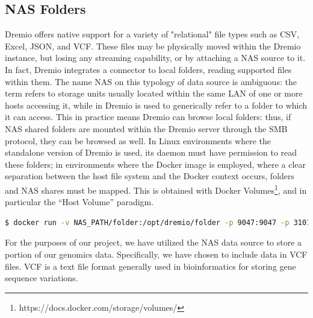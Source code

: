 \subsection{NAS Folders}
Dremio offers native support for a variety of "relational" file types such as \ac{CSV}, Excel, \ac{JSON}, and \ac{VCF}. These files may be physically moved within the Dremio instance, but losing any streaming capability, or by attaching a \ac{NAS} source to it. In fact, Dremio integrates a connector to local folders, reading supported files within them. The name \ac{NAS} on this typology of data source is ambiguous: the term refers to storage units usually located within the same \ac{LAN} of one or more hosts accessing it, while in Dremio is used to generically refer to a folder to which it can access.
This in practice means Dremio can browse local folders: thus, if NAS shared folders are mounted within the Dremio server through the \ac{SMB} protocol, they can be browsed as well.
In Linux environments where the standalone version of Dremio is used, its daemon must have permission to read these folders; in environments where the Docker image is employed, where a clear separation between the host file system and the Docker context occurs, folders and \ac{NAS} shares must be mapped. This is obtained with Docker Volumes\footnote{ https://docs.docker.com/storage/volumes/}, and in particular the “Host Volume” paradigm.
\begin{lstlisting}[language=bash, caption={Docker command to run a Dremio container with a Host Volume}, label={lst:docker-host-volume}]
$ docker run -v NAS_PATH/folder:/opt/dremio/folder -p 9047:9047 -p 31010:31010 -p 45678:45678 -p 32010:32010 --name hereditary_dremio dremio/dremio-oss
\end{lstlisting}
For the purposes of our project, we have utilized the \ac{NAS} data source to store a portion of our genomics data. Specifically, we have chosen to include data in \ac{VCF} files. \ac{VCF} is a text file format generally used in bioinformatics for storing gene sequence variations.

